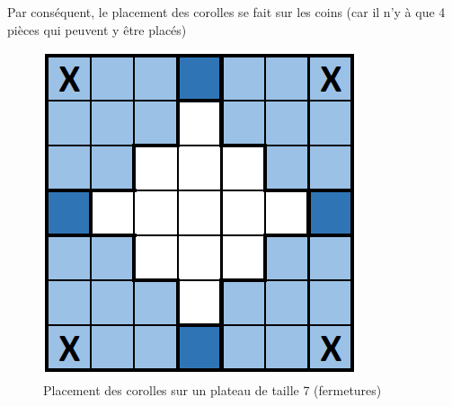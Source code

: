 		Par conséquent, le placement des corolles se fait sur les coins (car il n'y à que 4 pièces qui peuvent y être placés)
		
		\begin{figure}[H]
			\centering
			\includegraphics[width=0.5\linewidth]{images/corolle_placement_fermetures}
			\caption{Placement des corolles sur un plateau de taille 7 (fermetures)}
			\label{fig:corolle_placement_fermetures}
		\end{figure}
